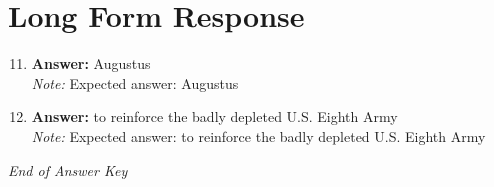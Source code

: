 \documentclass[12pt]{article}
\begin{document}
\section*{Long Form Response}
\begin{enumerate}[label=\arabic*.]
\setcounter{enumi}{10}
\item \textbf{Answer:} Augustus
\\ \textit{Note:} Expected answer: Augustus
\item \textbf{Answer:} to reinforce the badly depleted U.S. Eighth Army
\\ \textit{Note:} Expected answer: to reinforce the badly depleted U.S. Eighth Army
\end{enumerate}

\vfill
\noindent\textit{End of Answer Key}
\end{document}
